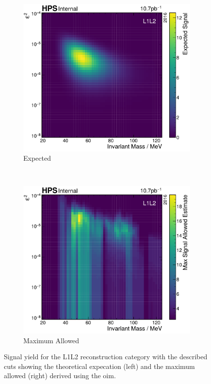\begin{figure}
  \centering
  \begin{subfigure}{0.48\textwidth}
    \includegraphics[width=\textwidth]{figures/hps/analysis/results/expected-signal.pdf}
    \caption{Expected}
    \label{fig:hps-signal-yield:expected}
  \end{subfigure}
  ~
  \begin{subfigure}{0.48\textwidth}
    \includegraphics[width=\textwidth]{figures/hps/analysis/results/max-signal-allowed.pdf}
    \caption{Maximum Allowed}
    \label{fig:hps-signal-yield:allowed}
  \end{subfigure}
  \caption{Signal yield for the L1L2 reconstruction category with the described cuts
  showing the theoretical expecation (left) and the maximum allowed (right) derived
  using the \ac{oim}.}
  \label{fig:hps-signal-yield}
\end{figure}

